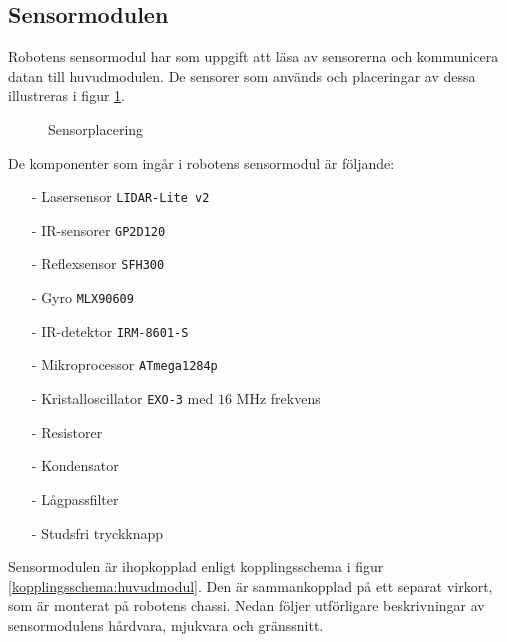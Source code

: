 \documentclass[11pt]{article}
\begin{document}
\begin{flushleft}
\subsection{Sensormodulen}
Robotens sensormodul har som uppgift att läsa av sensorerna och kommunicera datan till huvudmodulen. De sensorer som används och placeringar av dessa illustreras i figur \ref{sensors}.
\newline

\begin{figure}[htbp]
\centering
\noindent\resizebox{.8\textwidth}{!}{
 }
\caption{Sensorplacering \label{sensors}}
\end{figure}

De komponenter som ingår i robotens sensormodul är följande:
\begin{itemize}
\item[-] Lasersensor \verb+LIDAR-Lite v2+
\item[-] IR-sensorer \verb+GP2D120+
\item[-] Reflexsensor \verb+SFH300+
\item[-] Gyro \verb+MLX90609+
\item[-] IR-detektor \verb+IRM-8601-S+
\item[-] Mikroprocessor \verb+ATmega1284p+
\item[-] Kristalloscillator \verb+EXO-3+ med $16$ MHz frekvens
\item[-] Resistorer
\item[-] Kondensator
\item[-] Lågpassfilter
\item[-] Studsfri tryckknapp
\end{itemize}

Sensormodulen är ihopkopplad enligt kopplingsschema i figur \ref{kopplingsschema:huvudmodul}. Den är sammankopplad på ett separat virkort, som är monterat på robotens chassi. Nedan följer utförligare beskrivningar av sensormodulens hårdvara, mjukvara och gränssnitt.


\end{flushleft}
\end{document}
